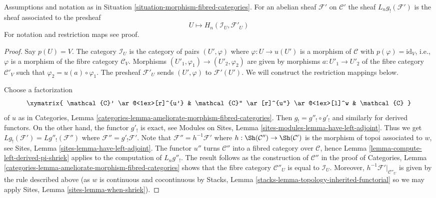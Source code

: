 \begin{lemma}
\label{lemma-compute-left-derived-g-shriek}
Assumptions and notation as in
Situation \ref{situation-morphism-fibred-categories}.
For an abelian sheaf $\mathcal{F}'$ on $\mathcal{C}'$ the sheaf
$L_ng_!(\mathcal{F}')$ is the sheaf associated to the presheaf
$$
U \longmapsto H_n(\mathcal{I}_U, \mathcal{F}'_U)
$$
For notation and restriction maps see proof.
\end{lemma}

\begin{proof}
Say $p(U) = V$. The category $\mathcal{I}_U$ is the category of pairs
$(U', \varphi)$ where $\varphi : U \to u(U')$ is a morphism of $\mathcal{C}$
with $p(\varphi) = \text{id}_V$, i.e., $\varphi$ is a morphism of the
fibre category $\mathcal{C}_V$. Morphisms
$(U'_1, \varphi_1) \to (U'_2, \varphi_2)$ are given by morphisms
$a : U'_1 \to U'_2$ of the fibre category $\mathcal{C}'_V$ such that
$\varphi_2 = u(a) \circ \varphi_1$. The presheaf $\mathcal{F}'_U$ sends
$(U', \varphi)$ to $\mathcal{F}'(U')$.
We will construct the restriction mappings below.

\medskip\noindent
Choose a factorization
$$
\xymatrix{
\mathcal{C}' \ar@<1ex>[r]^{u'} &
\mathcal{C}'' \ar[r]^{u''} \ar@<1ex>[l]^w & \mathcal{C}
}
$$
of $u$ as in
Categories, Lemma \ref{categories-lemma-ameliorate-morphism-fibred-categories}.
Then $g_! = g''_! \circ g'_!$ and similarly for derived functors.
On the other hand, the functor $g'_!$ is exact, see
Modules on Sites, Lemma \ref{sites-modules-lemma-have-left-adjoint}.
Thus we get $Lg_!(\mathcal{F}') = Lg''_!(\mathcal{F}'')$ where
$\mathcal{F}'' = g'_!\mathcal{F}'$. Note that
$\mathcal{F}'' = h^{-1}\mathcal{F}'$ where
$h : \Sh(\mathcal{C}'') \to \Sh(\mathcal{C}')$ is the morphism of topoi
associated to $w$, see
Sites, Lemma \ref{sites-lemma-have-left-adjoint}.
The functor $u''$ turns $\mathcal{C}''$ into a fibred category
over $\mathcal{C}$, hence
Lemma \ref{lemma-compute-left-derived-pi-shriek}
applies to the computation of $L_ng''_!$. The result follows as the
construction of $\mathcal{C}''$ in the proof of
Categories, Lemma \ref{categories-lemma-ameliorate-morphism-fibred-categories}
shows that the fibre category $\mathcal{C}''_U$ is equal to
$\mathcal{I}_U$. Moreover, $h^{-1}\mathcal{F}'|_{\mathcal{C}''_U}$
is given by the rule described above
(as $w$ is continuous and cocontinuous by
Stacks, Lemma \ref{stacks-lemma-topology-inherited-functorial}
so we may apply
Sites, Lemma \ref{sites-lemma-when-shriek}).
\end{proof}








